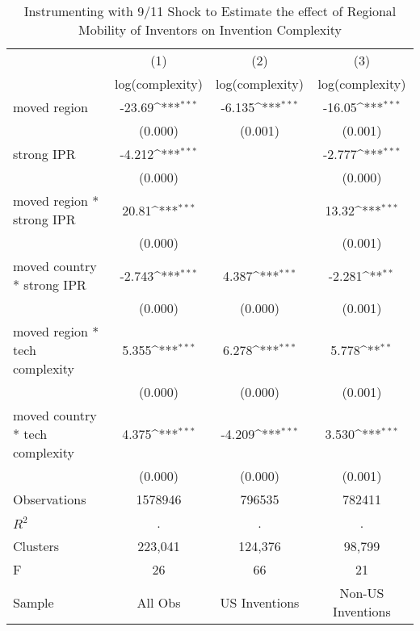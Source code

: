 {
\def\sym#1{\ifmmode^{#1}\else\(^{#1}\)\fi}
\begin{longtable}{l*{3}{c}}
\caption{Instrumenting with 9/11 Shock to Estimate the effect of Regional Mobility of Inventors on Invention Complexity \label{model9a9b9c}}\\
\hline\hline\endfirsthead\hline\endhead\hline\endfoot\endlastfoot
                &\multicolumn{1}{c}{(1)}&\multicolumn{1}{c}{(2)}&\multicolumn{1}{c}{(3)}\\
                &\multicolumn{1}{c}{log(complexity)}&\multicolumn{1}{c}{log(complexity)}&\multicolumn{1}{c}{log(complexity)}\\
\hline
moved region    &   -23.69\sym{***}&   -6.135\sym{***}&   -16.05\sym{***}\\
                &  (0.000)         &  (0.001)         &  (0.001)         \\
strong IPR      &   -4.212\sym{***}&                  &   -2.777\sym{***}\\
                &  (0.000)         &                  &  (0.000)         \\
moved region * strong IPR&    20.81\sym{***}&                  &    13.32\sym{***}\\
                &  (0.000)         &                  &  (0.001)         \\
moved country * strong IPR&   -2.743\sym{***}&    4.387\sym{***}&   -2.281\sym{**} \\
                &  (0.000)         &  (0.000)         &  (0.001)         \\
moved region * tech complexity&    5.355\sym{***}&    6.278\sym{***}&    5.778\sym{**} \\
                &  (0.000)         &  (0.000)         &  (0.001)         \\
moved country * tech complexity&    4.375\sym{***}&   -4.209\sym{***}&    3.530\sym{***}\\
                &  (0.000)         &  (0.000)         &  (0.001)         \\
\hline
Observations    &  1578946         &   796535         &   782411         \\
$R^2$              &        .         &        .         &        .         \\
Clusters         &  223,041         &  124,376         &   98,799         \\
F              &       26         &       66         &       21         \\
Sample          &  All Obs         &US Inventions         &Non-US Inventions         \\

\end{longtable}}
